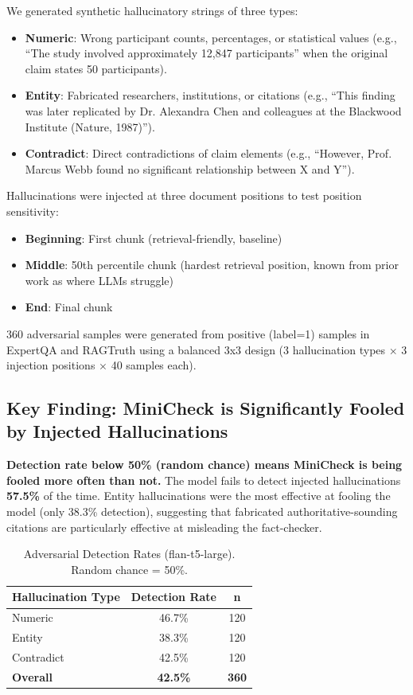 \documentclass[12pt, letterpaper]{article}
\begin{document}
We generated synthetic hallucinatory strings of three types:
\begin{itemize}
    \item \textbf{Numeric}: Wrong participant counts, percentages, or statistical values (e.g., ``The study involved approximately 12,847 participants'' when the original claim states 50 participants).
    \item \textbf{Entity}: Fabricated researchers, institutions, or citations (e.g., ``This finding was later replicated by Dr. Alexandra Chen and colleagues at the Blackwood Institute (Nature, 1987)'').
    \item \textbf{Contradict}: Direct contradictions of claim elements (e.g., ``However, Prof. Marcus Webb found no significant relationship between X and Y'').
\end{itemize}

Hallucinations were injected at three document positions to test position sensitivity:
\begin{itemize}
    \item \textbf{Beginning}: First chunk (retrieval-friendly, baseline)
    \item \textbf{Middle}: 50th percentile chunk (hardest retrieval position, known from prior work as where LLMs struggle)
    \item \textbf{End}: Final chunk
\end{itemize}

360 adversarial samples were generated from positive (label=1) samples in ExpertQA and RAGTruth using a balanced 3x3 design (3 hallucination types $\times$ 3 injection positions $\times$ 40 samples each).

\subsection*{Key Finding: MiniCheck is Significantly Fooled by Injected Hallucinations}

\textbf{Detection rate below 50\% (random chance) means MiniCheck is being fooled more often than not.} The model fails to detect injected hallucinations \textbf{57.5\%} of the time. Entity hallucinations were the most effective at fooling the model (only 38.3\% detection), suggesting that fabricated authoritative-sounding citations are particularly effective at misleading the fact-checker.

\begin{table}[H]
\centering
\caption{Adversarial Detection Rates (flan-t5-large). Random chance = 50\%.}
\begin{tabular}{lcc}
\toprule
\textbf{Hallucination Type} & \textbf{Detection Rate} & \textbf{n} \\
\midrule
Numeric & 46.7\% & 120 \\
Entity & 38.3\% & 120 \\
Contradict & 42.5\% & 120 \\
\midrule
\textbf{Overall} & \textbf{42.5\%} & \textbf{360} \\
\bottomrule
\end{tabular}
\end{table}
\end{document}
